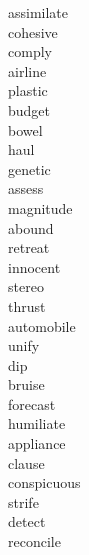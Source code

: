 \documentclass[a4paper, 10pt]{ctexart}
\begin{document}
\begin{multicols*}{2}
\begin{description}
\item[assimilate]

\item[cohesive]

\item[comply]

\item[airline]

\item[plastic]

\item[budget]

\item[bowel]

\item[haul]

\item[genetic]

\item[assess]

\item[magnitude]

\item[abound]

\item[retreat]

\item[innocent]

\item[stereo]

\item[thrust]

\item[automobile]

\item[unify]

\item[dip]

\item[bruise]

\item[forecast]

\item[humiliate]

\item[appliance]

\item[clause]

\item[conspicuous]

\item[strife]

\item[detect]

\item[reconcile]


\end{description}
\end{multicols*}
\end{document}
